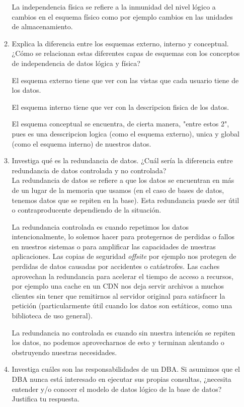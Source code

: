 \documentclass[12pt,a4paper]{article}
\begin{document}
\begin{enumerate}
\begin{enumerate}
La independencia física se refiere a la inmunidad del nivel lógico a cambios en el esquema físico como por ejemplo cambios en las unidades de almacenamiento.

			\item Explica la diferencia entre los esquemas externo, interno y conceptual. ¿Cómo se relacionan estas
				diferentes capas de esquemas con los conceptos de independencia de datos lógica y física?

				El esquema externo tiene que ver con las vistas que cada usuario tiene de los datos.
				
				El esquema interno tiene que ver con la descripcion fisica de los datos.
				
				El esquema conceptual se encuentra, de cierta manera, "entre estos 2", pues es una desscripcion logica 
				(como el esquema externo), unica y global (como el esquema interno) de nuestros datos.

			\item Investiga qué es la redundancia de datos. ¿Cuál sería la diferencia entre redundancia de datos
				controlada y no controlada?\\

				La redundancia de datos se refiere a que los datos se encuentran en más de un lugar de
				la memoria que usamos (en el caso de bases de datos, tenemos datos que se repiten en la base).
				Esta redundancia puede ser útil o contraproducente dependiendo de la situación.

				La redundancia controlada es cuando repetimos los datos intencionalmente, lo solemos
				hacer para protegernos de perdidas o fallos en nuestros sistemas o para amplificar las
				capacidades de nuestras aplicaciones.
				Las copias de seguridad \textit{offsite} por ejemplo nos protegen de perdidas de datos
				causadas por accidentes o catástrofes.
				Las caches aprovechan la redundancia para acelerar el tiempo de acceso a recursos,
				por ejemplo una cache en un CDN nos deja servir archivos a muchos clientes sin
				tener que remitirnos al servidor original para satisfacer la petición
				(particularmente útil cuando los datos son estáticos, como una biblioteca de uso general).

				La redundancia no controlada es cuando sin nuestra intención se repiten los datos,
				no podemos aprovecharnos de esto y terminan alentando o obstruyendo nuestras necesidades.

			\item Investiga cuáles son las responsabilidades de un DBA. Si asumimos que el DBA nunca está interesado
				en ejecutar sus propias consultas, ¿necesita entender y/o conocer el modelo de datos lógico de la
				base de datos? Justifica tu respuesta.


\end{enumerate}
\end{enumerate}
\end{document}
